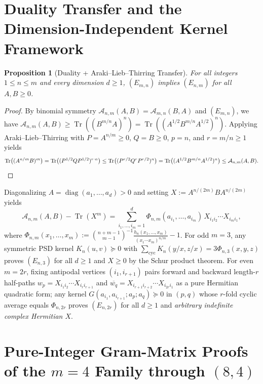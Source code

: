 \documentclass[11pt,a4paper]{article}
\newtheorem{proposition}[theorem]{Proposition}
\theoremstyle{remark}
\newcommand{\Tr}{\operatorname{Tr}}
\begin{document}
\section{Duality Transfer and the Dimension-Independent Kernel Framework}

\begin{proposition}[Duality + Araki--Lieb--Thirring Transfer]\label{prop:transfer}
For all integers $1\le n\le m$ and every dimension $d\ge 1$, $(E_{m,n})$ implies $(E_{n,m})$ for all $A,B\ge 0$.
\end{proposition}

\begin{proof}
By binomial symmetry $\mathcal{A}_{n,m}(A,B)=\mathcal{A}_{m,n}(B,A)$ and $(E_{m,n})$, we have $\mathcal{A}_{n,m}(A,B) \ge \Tr((B^{m/n}A)^n) = \Tr((A^{1/2}B^{m/n}A^{1/2})^n)$. Applying Araki--Lieb--Thirring with $P=A^{n/m}\ge 0$, $Q=B\ge 0$, $p=n$, and $r=m/n\ge 1$ yields
\[
\Tr\!\big((A^{n/m}B)^m\big) = \Tr\!\big((P^{1/2}QP^{1/2})^{r\cdot n}\big) \le \Tr\!\big((P^{r/2}Q^r P^{r/2})^n\big) = \Tr\!\big((A^{1/2}B^{m/n}A^{1/2})^n\big) \le \mathcal{A}_{n,m}(A,B). \qedhere
\]
\end{proof}

Diagonalizing $A=\operatorname{diag}(a_1,\dots,a_d)>0$ and setting $X:=A^{n/(2m)}BA^{n/(2m)}$ yields
\begin{equation}\label{eq:general_m_sum}
  \mathcal{A}_{n,m}(A,B) - \Tr(X^m) = \sum_{i_1,\dots,i_m=1}^d \Phi_{n,m}(a_{i_1},\dots,a_{i_m})\, X_{i_1 i_2}\cdots X_{i_m i_1},
\end{equation}
where $\Phi_{n,m}(x_1,\dots,x_m) := \binom{n+m-1}{m-1}^{-1}\frac{h_n(x_1,\dots,x_m)}{(x_1\cdots x_m)^{n/m}} - 1$.
For odd $m=3$, any symmetric PSD kernel $K_n(u,v)\succeq 0$ with $\sum_{\mathrm{cyc}} K_n(y/x,z/x) = 3\Phi_{n,3}(x,y,z)$ proves $(E_{n,3})$ for all $d\ge 1$ and $X\ge 0$ by the Schur product theorem. For even $m=2r$, fixing antipodal vertices $(i_1,i_{r+1})$ pairs forward and backward length-$r$ half-paths $w_p = X_{i_1 i_2}\cdots X_{i_r i_{r+1}}$ and $\overline{w_q} = X_{i_{r+1}i_{r+2}}\cdots X_{i_{2r}i_1}$ as a pure Hermitian quadratic form; any kernel $G(a_{i_1},a_{i_{r+1}}; a_p; a_q)\succeq 0$ in $(p,q)$ whose $r$-fold cyclic average equals $\Phi_{n,2r}$ proves $(E_{n,2r})$ for all $d\ge 1$ and \emph{arbitrary indefinite complex Hermitian $X$}.

\section{Pure-Integer Gram-Matrix Proofs of the $m=4$ Family through $(8,4)$}
\end{document}
